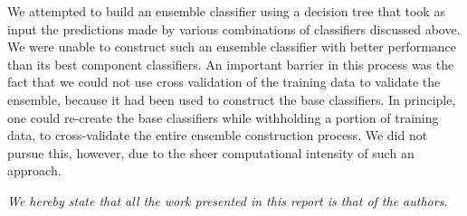 \documentclass[conference,letterpaper]{IEEEtran}
\begin{document}
We attempted to build an ensemble classifier using a decision tree that
took as input the predictions made by various combinations of classifiers
discussed above.  We were unable to construct such an ensemble classifier
with better performance than its best component classifiers.  An important 
barrier in this process was the fact that we could not use cross validation
of the training data to validate the ensemble, because it had been used to
construct the base classifiers.  In principle, one could re-create the base
classifiers while withholding a portion of training data, to cross-validate
the entire ensemble construction process.  We did not pursue this, however,
due to the sheer computational intensity of such an approach.

\begin{center}
	\textit{
		We hereby state that all the work presented in this report is 
		that of the authors.
	}
\end{center}


\end{document}
